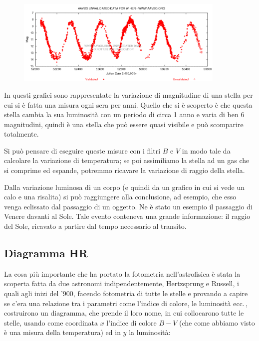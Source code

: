 \vspace{-0.5cm}

\begin{figure}[H]
   \centering
   \includegraphics[width=10cm]{immagini/fotometria_luminosita_relativa_2.png}
\end{figure}

In questi grafici sono rappresentate la variazione di magnitudine di una stella per cui si è fatta una misura ogni sera per anni. Quello che si è scoperto è che questa stella cambia la sua luminosità con un periodo di circa 1 anno e varia di ben 6 magnitudini, quindi è una stella che può essere quasi visibile e può scomparire totalmente.

Si può pensare di eseguire queste misure con i filtri $B$ e $V$ in modo tale da calcolare la variazione di temperatura; se poi assimiliamo la stella ad un gas che si comprime ed espande, potremmo ricavare la variazione di raggio della stella.


Dalla variazione luminosa di un corpo (e quindi da un grafico in cui si vede un calo e una risalita) si può raggiungere alla conclusione, ad esempio, che esso venga eclissato dal passaggio di un oggetto. Ne è stato un esempio il passaggio di Venere davanti al Sole. Tale evento conteneva una grande informazione: il raggio del Sole, ricavato a partire dal tempo necessario al transito.

\subsection{Diagramma HR}
La cosa più importante che ha portato la fotometria nell'astrofisica è stata la scoperta fatta da due astronomi indipendentemente, Hertzsprung e Russell, i quali agli inizi del '900, facendo fotometria di tutte le stelle e provando a capire se c'era una relazione tra i parametri come l'indice di colore, le luminosità ecc.\,, costruirono un diagramma, che prende il loro nome, in cui collocarono tutte le stelle, usando come coordinata $x$ l'indice di colore $B-V$ (che come abbiamo visto è una misura della temperatura) ed in $y$ la luminosità:

